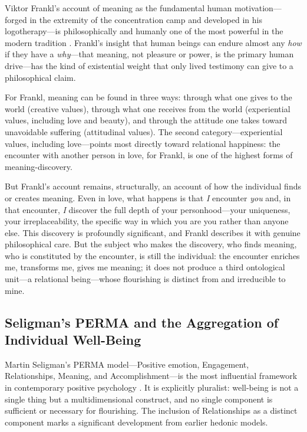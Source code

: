 \noindent
Viktor Frankl's account of meaning as the fundamental human motivation---forged in the extremity of the concentration camp and developed in his logotherapy---is philosophically and humanly one of the most powerful in the modern tradition \parencite{frankl1959}. Frankl's insight that human beings can endure almost any \emph{how} if they have a \emph{why}---that meaning, not pleasure or power, is the primary human drive---has the kind of existential weight that only lived testimony can give to a philosophical claim.

For Frankl, meaning can be found in three ways: through what one gives to the world (creative values), through what one receives from the world (experiential values, including love and beauty), and through the attitude one takes toward unavoidable suffering (attitudinal values). The second category---experiential values, including love---points most directly toward relational happiness: the encounter with another person in love, for Frankl, is one of the highest forms of meaning-discovery.

But Frankl's account remains, structurally, an account of how the individual finds or creates meaning. Even in love, what happens is that \emph{I} encounter \emph{you} and, in that encounter, \emph{I} discover the full depth of your personhood---your uniqueness, your irreplaceability, the specific way in which you are you rather than anyone else. This discovery is profoundly significant, and Frankl describes it with genuine philosophical care. But the subject who makes the discovery, who finds meaning, who is constituted by the encounter, is still the individual: the encounter enriches me, transforms me, gives me meaning; it does not produce a third ontological unit---a relational being---whose flourishing is distinct from and irreducible to mine.

\subsection{Seligman's PERMA and the Aggregation of Individual Well-Being}
\label{p14:subsec:perma}

\noindent
Martin Seligman's PERMA model---Positive emotion, Engagement, Relationships, Meaning, and Accomplishment---is the most influential framework in contemporary positive psychology \parencite{seligman2011}. It is explicitly pluralist: well-being is not a single thing but a multidimensional construct, and no single component is sufficient or necessary for flourishing. The inclusion of Relationships as a distinct component marks a significant development from earlier hedonic models.

